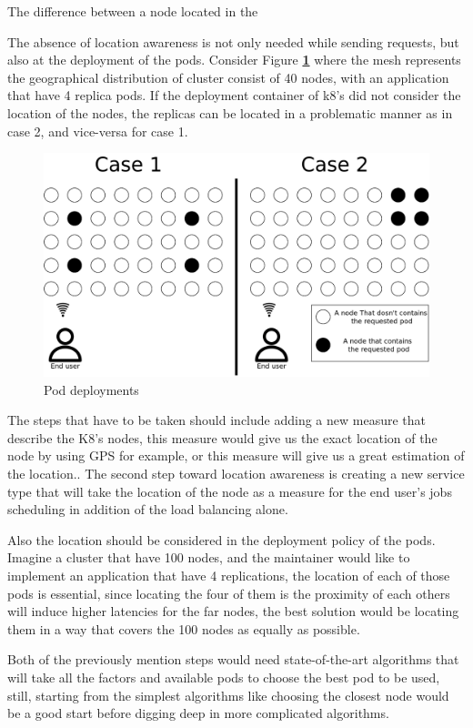 \documentclass[letterpaper,twocolumn,10pt]{article}
\let\origref\ref
\def\ref#1{\textbf{\origref{#1}}}
\begin{document}
The difference between a node located in the 

The absence of location awareness is not only needed while sending requests, but also at the deployment of the pods. Consider Figure \ref{fig:dep} where the mesh represents the geographical distribution of cluster consist of 40 nodes, with an application that have 4 replica pods. If the deployment container of k8's did not consider the location of the nodes, the replicas can be located in a problematic manner as in case 2, and vice-versa for case 1. 

\begin{figure}[th]
\centering\includegraphics[width=.5\textwidth]{images/dep.png}
\caption{Pod deployments}
\label{fig:dep}
\end{figure}


The steps that have to be taken should include adding a new measure that describe the K8's nodes, this measure would give us the exact location of the node by using GPS for example, or this measure will give us a great estimation of the location.. 
The second step toward location awareness is creating a new service type that will take the location of the node as a measure for the end user's jobs scheduling in addition of the load balancing alone.

Also the location should be considered in the deployment policy of the pods. Imagine a cluster that have 100 nodes, and the maintainer would like to implement an application that have 4 replications, the location of each of those pods is essential, since locating the four of them is the proximity of each others will induce higher latencies for the far nodes, the best solution would be locating them in a way that covers the 100 nodes as equally as possible. 

Both of the previously mention steps would need state-of-the-art algorithms that will take all the factors and available pods to choose the best pod to be used, still, starting from the simplest algorithms like choosing the closest node would be a good start before digging deep in more complicated algorithms.
\end{document}
